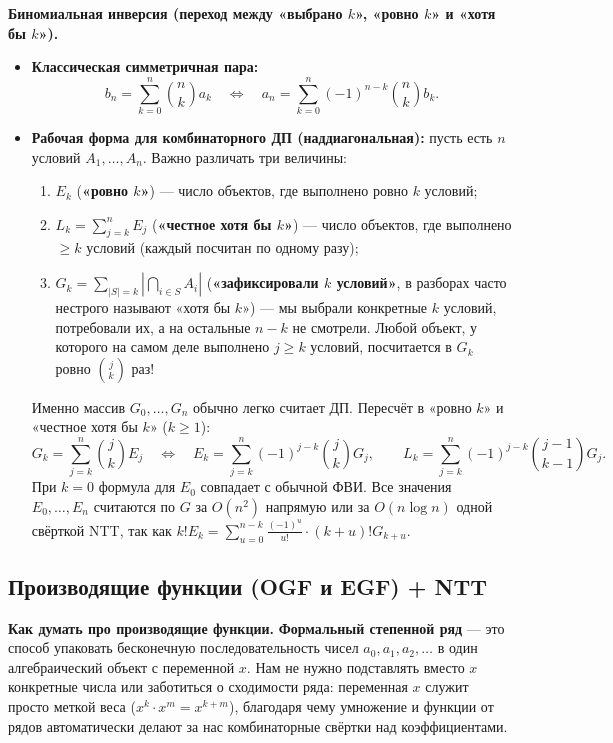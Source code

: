 \documentclass[10pt,a4paper]{article}
\renewcommand{\ge}{\geqslant}
\begin{document}
\textbf{Биномиальная инверсия (переход между «выбрано $k$», «ровно $k$» и «хотя бы $k$»).}
\begin{itemize}
  \item \textbf{Классическая симметричная пара:}
  \[
    b_n = \sum_{k=0}^{n} \binom{n}{k} a_k \quad \Longleftrightarrow \quad a_n = \sum_{k=0}^{n} (-1)^{n - k} \binom{n}{k} b_k.
  \]
  \item \textbf{Рабочая форма для комбинаторного ДП (наддиагональная):} пусть есть $n$ условий $A_1, \dots, A_n$. Важно различать три величины:
  \begin{enumerate}
    \item $E_k$ (\textbf{«ровно $k$»}) — число объектов, где выполнено ровно $k$ условий;
    \item $L_k = \sum_{j=k}^n E_j$ (\textbf{«честное хотя бы $k$»}) — число объектов, где выполнено $\ge k$ условий (каждый посчитан по одному разу);
    \item $G_k = \sum_{|S| = k} \left|\bigcap_{i \in S} A_i\right|$ (\textbf{«зафиксировали $k$ условий»}, в разборах часто нестрого называют «хотя бы $k$») — мы выбрали конкретные $k$ условий, потребовали их, а на остальные $n - k$ не смотрели. Любой объект, у которого на самом деле выполнено $j \ge k$ условий, посчитается в $G_k$ ровно $\binom{j}{k}$ раз!
  \end{enumerate}
  Именно массив $G_0, \dots, G_n$ обычно легко считает ДП. Пересчёт в «ровно $k$» и «честное хотя бы $k$» ($k \ge 1$):
  \[
    G_k = \sum_{j=k}^{n} \binom{j}{k} E_j \quad \Longleftrightarrow \quad
    E_k = \sum_{j=k}^{n} (-1)^{j - k} \binom{j}{k} G_j, \qquad
    L_k = \sum_{j=k}^{n} (-1)^{j - k} \binom{j - 1}{k - 1} G_j.
  \]
  При $k = 0$ формула для $E_0$ совпадает с обычной ФВИ. Все значения $E_0, \dots, E_n$ считаются по $G$ за $O(n^2)$ напрямую или за $O(n \log n)$ одной свёрткой NTT, так как $k! E_k = \sum_{u=0}^{n - k} \frac{(-1)^u}{u!} \cdot (k + u)! G_{k + u}$.
\end{itemize}

\subsection{Производящие функции (OGF и EGF) + NTT}

\textbf{Как думать про производящие функции.} \textbf{Формальный степенной ряд} — это способ упаковать бесконечную последовательность чисел $a_0, a_1, a_2, \dots$ в один алгебраический объект с переменной $x$. Нам не нужно подставлять вместо $x$ конкретные числа или заботиться о сходимости ряда: переменная $x$ служит просто меткой веса ($x^k \cdot x^m = x^{k + m}$), благодаря чему умножение и функции от рядов автоматически делают за нас комбинаторные свёртки над коэффициентами.
\end{document}
